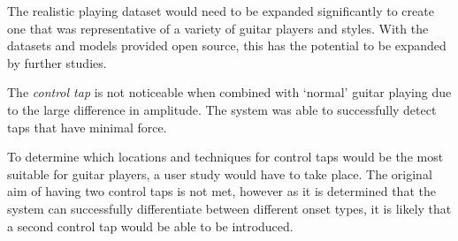 \documentclass[conference]{IEEEtran}
\begin{document}
The realistic playing dataset would need to be expanded significantly to create one that was representative of a variety of guitar players and styles. With the datasets and models provided open source, this has the potential to be expanded by further studies.

The \emph{control tap} is not noticeable when combined with `normal' guitar playing due to the large difference in amplitude. The system was able to successfully detect taps that have minimal force.

To determine which locations and techniques for control taps would be the most suitable for guitar players, a user study would have to take place. The original aim of having two control taps is not met, however as it is determined
that the system can successfully differentiate between different onset types, it is likely that a second control tap would be able to be introduced.
\end{document}
